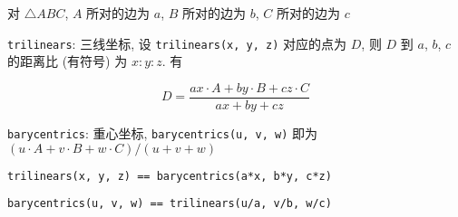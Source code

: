 对 \(\triangle ABC\), \(A\) 所对的边为 \(a\), \(B\) 所对的边为 \(b\), \(C\) 所对的边为 \(c\)

\verb|trilinears|: 三线坐标, 设 \verb|trilinears(x, y, z)| 对应的点为 \(D\), 则 \(D\) 到 \(a\), \(b\), \(c\) 的距离比 (有符号) 为 \(x:y:z\). 有

\[
    D=\frac{ax\cdot A+by\cdot B+cz\cdot C}{ax+by+cz}
\]

\verb|barycentrics|: 重心坐标, \verb|barycentrics(u, v, w)| 即为 \((u\cdot A+v\cdot B+w\cdot C)/(u+v+w)\)

\verb|trilinears(x, y, z) == barycentrics(a*x, b*y, c*z)|

\verb|barycentrics(u, v, w) == trilinears(u/a, v/b, w/c)|
